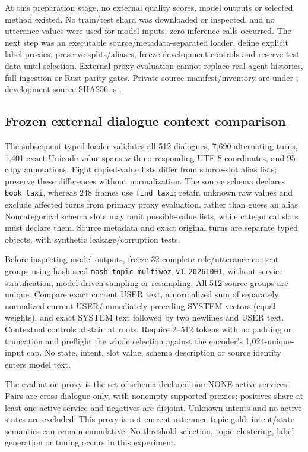 \documentclass[11pt]{article}
\begin{document}
At this preparation stage, no external quality scores, model outputs or selected
method existed. No train/test shard was downloaded or inspected, and no utterance
values were used for model inputs; zero inference calls occurred. The next step
was an executable source/metadata-separated loader,
define explicit label proxies, preserve splits/aliases, freeze development controls
and reserve test data until selection. External proxy evaluation cannot replace real
agent histories, full-ingestion or Rust-parity gates. Private source manifest/inventory
are under ; development source SHA256 is
.

\subsection{Frozen external dialogue context comparison}
The subsequent typed loader validates all 512 dialogues, 7,690 alternating turns,
1,401 exact Unicode value spans with corresponding UTF-8 coordinates, and 95
copy annotations. Eight copied-value lists differ from source-slot alias lists;
preserve these differences without normalization. The source schema declares
\texttt{book\_taxi}, whereas 248 frames use \texttt{find\_taxi}; retain unknown raw
values and exclude affected turns from primary proxy evaluation, rather than
guess an alias. Noncategorical schema slots may omit possible-value lists, while
categorical slots must declare them. Source metadata and exact original turns
are separate typed objects, with synthetic leakage/corruption tests.

Before inspecting model outputs, freeze 32 complete role/utterance-content groups
using hash seed \texttt{mash-topic-multiwoz-v1-20261001}, without service
stratification, model-driven sampling or resampling. All 512 source groups are
unique. Compare exact current USER text, a normalized sum of separately normalized
current USER/immediately preceding SYSTEM vectors (equal weights), and exact
SYSTEM text followed by two newlines and USER text. Contextual controls abstain
at roots. Require 2--512 tokens with no padding or truncation and preflight the
whole selection against the encoder's 1,024-unique-input cap. No state, intent,
slot value, schema description or source identity enters model text.

The evaluation proxy is the set of schema-declared non-NONE active services.
Pairs are cross-dialogue only, with nonempty supported proxies; positives share
at least one active service and negatives are disjoint. Unknown intents and
no-active states are excluded. This proxy is not current-utterance topic gold:
intent/state semantics can remain cumulative. No threshold selection, topic
clustering, label generation or tuning occurs in this experiment.
\end{document}
